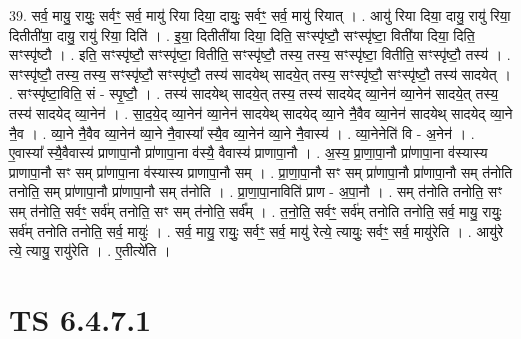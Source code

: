 \documentclass[17pt]{extarticle}
\begin{document}
39. सर्व॒ मायु॒ रायुः॒ सर्वꣳ॒॒ सर्व॒ मायु॑ रिया दिया॒ दायुः॒ सर्वꣳ॒॒ सर्व॒ मायु॑ रियात् । . आयु॑ रिया दिया॒ दायु॒ रायु॑ रिया॒ दितीती॑या॒ दायु॒ रायु॑ रिया॒ दिति॑ । . इ॒या॒ दितीती॑या दिया॒ दिति॒ सꣳस्पृ॑ष्टौ॒ सꣳस्पृ॑ष्टा॒ विती॑या दिया॒ दिति॒ सꣳस्पृ॑ष्टौ । . इति॒ सꣳस्पृ॑ष्टौ॒ सꣳस्पृ॑ष्टा॒ वितीति॒ सꣳस्पृ॑ष्टौ॒ तस्य॒ तस्य॒ सꣳस्पृ॑ष्टा॒ वितीति॒ सꣳस्पृ॑ष्टौ॒ तस्य॑ । . सꣳस्पृ॑ष्टौ॒ तस्य॒ तस्य॒ सꣳस्पृ॑ष्टौ॒ सꣳस्पृ॑ष्टौ॒ तस्य॑ सादयेथ् सादये॒त् तस्य॒ सꣳस्पृ॑ष्टौ॒ सꣳस्पृ॑ष्टौ॒ तस्य॑ सादयेत् । . सꣳस्पृ॑ष्टा॒विति॒ सं - स्पृ॒ष्टौ॒ । . तस्य॑ सादयेथ् सादये॒त् तस्य॒ तस्य॑ सादयेद् व्या॒नेन॑ व्या॒नेन॑ सादये॒त् तस्य॒ तस्य॑ सादयेद् व्या॒नेन॑ । . सा॒द॒ये॒द् व्या॒नेन॑ व्या॒नेन॑ सादयेथ् सादयेद् व्या॒ने नै॒वैव व्या॒नेन॑ सादयेथ् सादयेद् व्या॒ने नै॒व । . व्या॒ने नै॒वैव व्या॒नेन॑ व्या॒ने नै॒वास्या᳚ स्यै॒व व्या॒नेन॑ व्या॒ने नै॒वास्य॑ । . व्या॒नेनेति॑ वि - अ॒नेन॑ । . ए॒वास्या᳚ स्यै॒वैवास्य॑ प्राणापा॒नौ प्रा॑णापा॒ना व॑स्यै॒ वैवास्य॑ प्राणापा॒नौ । . अ॒स्य॒ प्रा॒णा॒पा॒नौ प्रा॑णापा॒ना व॑स्यास्य प्राणापा॒नौ सꣳ सम् प्रा॑णापा॒ना व॑स्यास्य प्राणापा॒नौ सम् । . प्रा॒णा॒पा॒नौ सꣳ सम् प्रा॑णापा॒नौ प्रा॑णापा॒नौ सम् त॑नोति तनोति॒ सम् प्रा॑णापा॒नौ प्रा॑णापा॒नौ सम् त॑नोति । . प्रा॒णा॒पा॒नाविति॑ प्राण - अ॒पा॒नौ । . सम् त॑नोति तनोति॒ सꣳ सम् त॑नोति॒ सर्वꣳ॒॒ सर्व॑म् तनोति॒ सꣳ सम् त॑नोति॒ सर्व᳚म् । . त॒नो॒ति॒ सर्वꣳ॒॒ सर्व॑म् तनोति तनोति॒ सर्व॒ मायु॒ रायुः॒ सर्व॑म् तनोति तनोति॒ सर्व॒ मायुः॑ । . सर्व॒ मायु॒ रायुः॒ सर्वꣳ॒॒ सर्व॒ मायु॑ रेत्ये॒ त्यायुः॒ सर्वꣳ॒॒ सर्व॒ मायु॑रेति । . आयु॑रे त्ये॒ त्यायु॒ रायु॑रेति । . ए॒तीत्ये॑ति । \newline
\pagebreak
{}

\section{ TS 6.4.7.1 }
\end{document}
